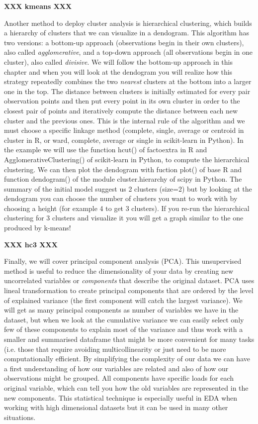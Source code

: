 \textbf{XXX  kmeans  XXX}

Another method to deploy cluster analysis is hierarchical clustering, which builds a hierarchy of clusters that we can visualize in a dendogram.  This algorithm has two versions: a bottom-up approach (observations begin in their own clusters), also called \textit{agglomerative}, and a top-down approach (all observations begin in one cluster), also called \textit{divisive}. We will follow the bottom-up approach in this chapter and when you will look at the dendogram you will realize how this strategy repeatedly combines the two \textit{nearest} clusters at the bottom into a larger one in the top. The distance between clusters is initially estimated for every pair observation points and then put every point in its own cluster in order to the closest pair of points and iteratively compute the distance between each new cluster and the previous ones. This is the internal rule of the algorithm and we must choose a specific linkage method (complete, single, average or centroid in cluster in R, or ward, complete, average or single in scikit-learn in Python). In the example we will use the function hcut() of factoextra in R and AgglomerativeClustering() of scikit-learn in Python, to compute the hierarchical clustering. We can then plot the dendogram  with fuction plot() of base R and function dendogram() of the module cluster.hierarchy of scipy in Python. The summary of the initial model suggest us 2 clusters (size=2) but by looking at the dendogram you can choose the number of clusters you want to work with by choosing a height (for example 4 to get 3 clusters). If you re-run the hierarchical clustering for 3 clusters and visualize it you will get a graph similar to the one produced by k-means!

\textbf{XXX  hc3  XXX}

Finally, we will cover principal component analysis (PCA). This unsupervised method is useful to reduce the dimensionality of your data by creating new uncorrelated variables or \textit{components} that describe the original dataset. PCA uses lineal transformation to create principal components that are ordered by the level of explained variance (the first component will catch the largest variance). We will get as many principal components as number of variables we have in the dataset, but when we look at the cumulative variance we can easily select only few of these components to explain most of the variance and thus work with a smaller and summarised dataframe that might be more convenient for many tasks (i.e. those that require avoiding multicollinearity or just need to be more computationally efficient. By simplifying the complexity of our data we can have a first understanding of how our variables are related and also of how our observations might be grouped. All components have specific loads for each original variable, which can tell you how the old variables are represented in the new components. This statistical technique is especially useful in EDA when working with high dimensional datasets but it can be used in many other situations.  

